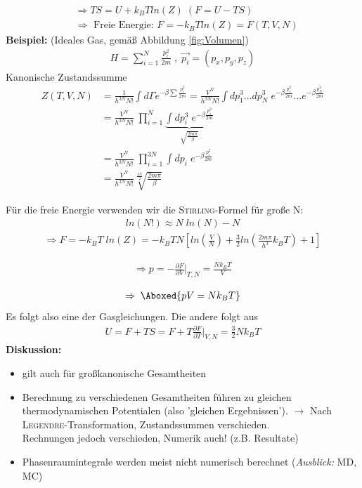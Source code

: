 \documentclass[12pt]{article}
\begin{document}
\begin{itemize}
\begin{align}
&\Rightarrow TS = U + k_B T ln(Z) \; (F= U - TS) \\
& \Rightarrow \mbox{ Freie Energie: } F = - k_B T ln(Z) = F(T,V,N)
\end{align}
\textbf{Beispiel:} (Ideales Gas, gemäß Abbildung \ref{fig:Volumen})
\begin{align*}
H = \sum_{i=1}^N \frac{p_i ^2}{2m} \; ,  \; \vec{p_i} = (p_x, p_y, p_z)
\end{align*}
Kanonische Zustandssumme
\begin{align*}
Z(T,V,N) &= \frac{1}{h^{3N} N!} \int d\Gamma e^{- \beta \sum \frac{p_i ^2}{2m} } = \frac{V^N}{h^{3N} N!} \int dp_1 ^3 ...dp_N ^3 \;  e^{ - \beta \frac{p_1 ^2}{2m}} ... e^{- \beta \frac{p_N ^2}{2m}}  \\
&=  \frac{V^N}{h^{3N} N!} \; \prod_{i=1}^N \underbrace{\int dp_i ^3 \; e^{- \beta \frac{p_i ^2}{2m}} }_{ \sqrt{\frac{2m\pi}{\beta}}} \tag{$i = 1...N$ Teilchen} \\
&= \frac{V^N}{h^{3N} N!} \; \prod_{i=1}^{3N}  \int dp_i  \; e^{- \beta \frac{p_i ^2}{2m}} \tag{$i = 1...3N,$  N Teilchen mit $(x,y,z)$} \\
&= \frac{V^N}{h^{3N} N!} \sqrt[\frac{3N}{2}]{\frac{2m\pi}{\beta}}
\end{align*} %
\end{itemize}
Für die freie Energie verwenden wir die \textsc{Stirling}-Formel für große N:
\begin{align}
ln(N!) \approx N \; ln(N) - N
\end{align}
\begin{align}
\Rightarrow F = -k_B T \; ln(Z) = -k_B T N \left[ ln \left(\frac{V}{N}\right) + \frac{3}{2} ln \left(\frac{2 m \pi }{h^3} k_BT \right) +1 \right]
\end{align}

\begin{align}
\Rightarrow p = - \frac{\partial F}{\partial V} \biggr\vert_{T,N} = \frac{N k_B T}{V}
\end{align}

\begin{align}
 \Rightarrow \; \Aboxed{ p V = N k_B T}
\end{align}
Es folgt also eine der Gasgleichungen. Die andere folgt aus
\begin{align}
U = F + TS = F + T \frac{\partial F}{\partial T} \biggr\vert_{V,N} = \frac{3}{2} N k_B T
\end{align}
\textbf{Diskussion:} \\
\begin{itemize}
\item gilt auch für großkanonische Gesamtheiten
\item Berechnung zu verschiedenen Gesamtheiten führen zu gleichen thermodynamischen Potentialen (also 'gleichen Ergebnissen'). $\to$ Nach \textsc{Legendre}-Transformation, Zustandssummen verschieden. \\
Rechnungen jedoch verschieden, Numerik auch! (z.B. Resultate) %
\item Phasenraumintegrale werden meist nicht numerisch berechnet %
(\textit{Ausblick:} MD, MC) 
\end{itemize}
\end{document}

